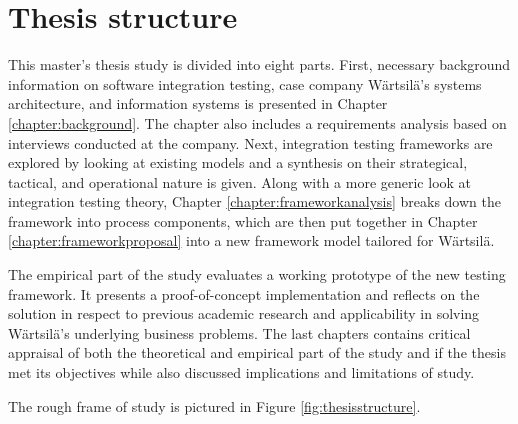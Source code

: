 \documentclass[12pt,a4paper,oneside,pdftex]{report}
\begin{document}
\section{Thesis structure}
\label{section:structure}

This master's thesis study is divided into eight parts. First, necessary background information on software integration testing, case company Wärtsilä's systems architecture, and information systems is presented in Chapter \ref{chapter:background}. The chapter also includes a requirements analysis based on interviews conducted at the company. Next, integration testing frameworks are explored by looking at existing models and a synthesis on their strategical, tactical, and operational nature is given. Along with a more generic look at integration testing theory, Chapter \ref{chapter:frameworkanalysis} breaks down the framework into process components, which are then put together in Chapter \ref{chapter:frameworkproposal} into a new framework model tailored for Wärtsilä.

The empirical part of the study evaluates a working prototype of the new testing framework. It presents a proof-of-concept implementation and reflects on the solution in respect to previous academic research and applicability in solving Wärtsilä's underlying business problems. The last chapters contains critical appraisal of both the theoretical and empirical part of the study and if the thesis met its objectives while also discussed implications and limitations of study. 

The rough frame of study is pictured in Figure \ref{fig:thesisstructure}.
\end{document}
